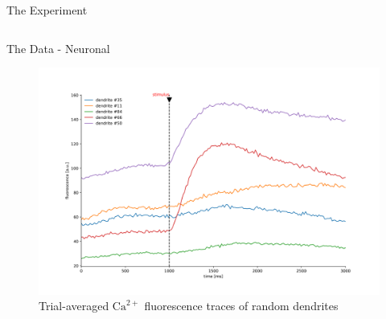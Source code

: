\documentclass[10pt]{beamer}
\begin{document}
\begin{frame}[fragile]{The Experiment}
\begin{columns}[T,onlytextwidth]

  \end{columns}
\end{frame}

\begin{frame}[fragile]{The Data - Neuronal}
	\begin{center}
	\begin{figure}
	\caption*{Trial-averaged $\text{Ca}^{2+}$ fluorescence traces of random dendrites}
      \includegraphics[scale=0.35]{traces.png}
	\end{figure}
	\end{center}
\end{frame}
\end{document}
